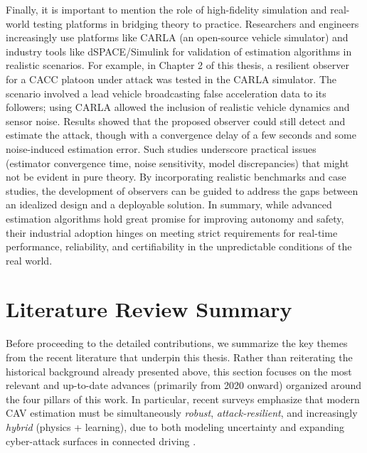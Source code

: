 Finally, it is important to mention the role of high-fidelity simulation and real-world testing platforms in bridging theory to practice. Researchers and engineers increasingly use platforms like CARLA \cite{CarlarSim} (an open-source vehicle simulator) and industry tools like dSPACE/Simulink for validation of estimation algorithms in realistic scenarios. For example, in Chapter 2 of this thesis, a resilient observer for a CACC platoon under attack was tested in the CARLA simulator. The scenario involved a lead vehicle broadcasting false acceleration data to its followers; using CARLA allowed the inclusion of realistic vehicle dynamics and sensor noise. Results showed that the proposed observer could still detect and estimate the attack, though with a convergence delay of a few seconds and some noise-induced estimation error. Such studies underscore practical issues (estimator convergence time, noise sensitivity, model discrepancies) that might not be evident in pure theory. By incorporating realistic benchmarks and case studies, the development of observers can be guided to address the gaps between an idealized design and a deployable solution. In summary, while advanced estimation algorithms hold great promise for improving autonomy and safety, their industrial adoption hinges on meeting strict requirements for real-time performance, reliability, and certifiability in the unpredictable conditions of the real world.

\section{Literature Review Summary}
Before proceeding to the detailed contributions, we summarize the key themes from the recent literature that underpin this thesis. Rather than reiterating the historical background already presented above, this section focuses on the most relevant and up-to-date advances (primarily from 2020 onward) organized around the four pillars of this work. In particular, recent surveys emphasize that modern CAV estimation must be simultaneously \emph{robust}, \emph{attack-resilient}, and increasingly \emph{hybrid} (physics + learning), due to both modeling uncertainty and expanding cyber-attack surfaces in connected driving \cite{Sun2022CyberSecurityCAVSurvey,Ju2022AttackDetectionResilienceSurvey}.


